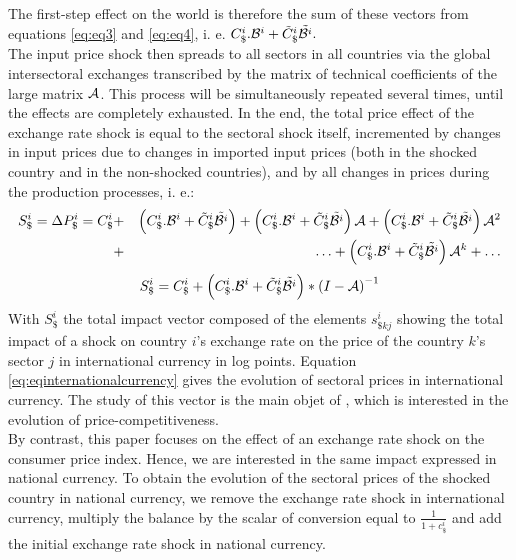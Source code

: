 \documentclass[11pt,a4paper]{article}
\begin{document}
The first-step effect on the world is therefore the sum of these vectors from equations  \ref{eq:eq3} and \ref{eq:eq4}, i. e. $C_\$^i.{\cal B}^i+{\tilde{C}_\$^i}{\tilde{{\cal B}^i}}.~$\\
The input price shock then spreads to all sectors in all countries via the global intersectoral exchanges transcribed by the matrix of technical coefficients of the large matrix $\cal {A}$. This process will be simultaneously repeated several times, until the effects are completely exhausted.
In the end, the total price effect of the exchange rate shock is equal to the sectoral shock itself, incremented by changes in input prices due to changes in imported input prices (both in the shocked country and in the non-shocked countries), and by all changes in prices during the production processes, i. e.:\\
\begin{eqnarray*}
S_\$^i = \Delta{{P}_{\$}^i}=C_\$^i&+& \left(C_\$^i.{\cal B}^i+{\tilde{C}_\$^i}{\tilde{{\cal B}^ i}}\right)+ \left(C_\$^i.{\cal B}^i+{\tilde{C}_\$^i}{\tilde{{\cal B}^i}}\right){{\cal A}}+\left(C_\$^i.{\cal B}^i+{\tilde{C}_\$^i}{\tilde{{\cal B}^i}}\right){{\cal A}^{2}} \\
&+&\ldots+\left(C_\$^i.{\cal B}^i+{\tilde{C}_\$^i}{\tilde{{\cal B}^i}}\right){\cal A}^k +\ldots \\
\end{eqnarray*}
 \begin{eqnarray}
S_\$^i=C_\$^i+\left(C_\$^i.{\cal B}^i+{\tilde{C}_\$^i}{\tilde{{\cal B}^i}}\right)*{{(I-{\cal A})}^{-1}}	
\label{eq:eqinternationalcurrency}
 \end{eqnarray}
With $S_\$^i$ the total impact vector composed of the elements ${{{s}}^i_{\$kj}}$ showing the total impact of a shock on country $i$'s exchange rate on the price of the country $k$'s sector $j$ in international currency in log points. 
Equation \ref{eq:eqinternationalcurrency} gives the evolution of sectoral prices in international currency. The study of this vector is the main objet of \cite{Cochard2016}, which is interested in the evolution of price-competitiveness.\\
By contrast, this paper focuses on the effect of an exchange rate shock on the consumer price index. Hence, we are interested in the same impact expressed in national currency. To obtain the evolution of the sectoral prices of the shocked country in national currency, we remove the exchange rate shock in international currency, multiply the balance by the scalar of conversion equal to $\frac{1}{1+c_\$^i}$ and add the initial exchange rate shock in national currency.
\end{document}
